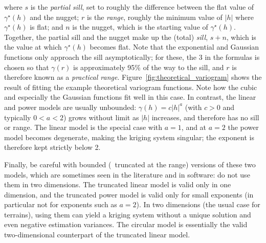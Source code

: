 where \(s\) is the \emph{partial sill}, set to roughly the difference between the flat value of \(\gamma^\star(h)\) and the nugget; \(r\) is the \emph{range}, roughly the minimum value of \(|h|\) where \(\gamma^\star(h)\) is flat; and \(n\) is the nugget, which is the starting value of \(\gamma^\star(h)\). Together, the partial sill and the nugget make up the (total) \emph{sill}, \(s + n\), which is the value at which \(\gamma^\star(h)\) becomes flat.
Note that the exponential and Gaussian functions only approach the sill asymptotically; for these, the 3 in the formulas is chosen so that \(\gamma(r)\) is approximately 95\% of the way to the sill, and \(r\) is therefore known as a \emph{practical range}.
Figure~\ref{fig:theoretical_variogram} shows the result of fitting the example theoretical variogram functions.
Note how the cubic and especially the Gaussian functions fit well in this case.
In contrast, the linear and power models are usually unbounded: \(\gamma(h) = c|h|^a\) (with \(c > 0\) and typically \(0 < a < 2\)) grows without limit as \(|h|\) increases, and therefore has no sill or range.
The linear model is the special case with \(a = 1\), and at \(a = 2\) the power model becomes degenerate, making the kriging system singular; the exponent is therefore kept strictly below 2.

Finally, be careful with bounded (\ie\ truncated at the range) versions of these two models, which are sometimes seen in the literature and in software: do not use them in two dimensions.
The truncated linear model is valid only in one dimension, and the truncated power model is valid only for small exponents (in particular not for exponents such as \(a = 2\)).
In two dimensions (the usual case for terrains), using them can yield a kriging system without a unique solution and even negative estimation variances.
The circular model is essentially the valid two-dimensional counterpart of the truncated linear model.


